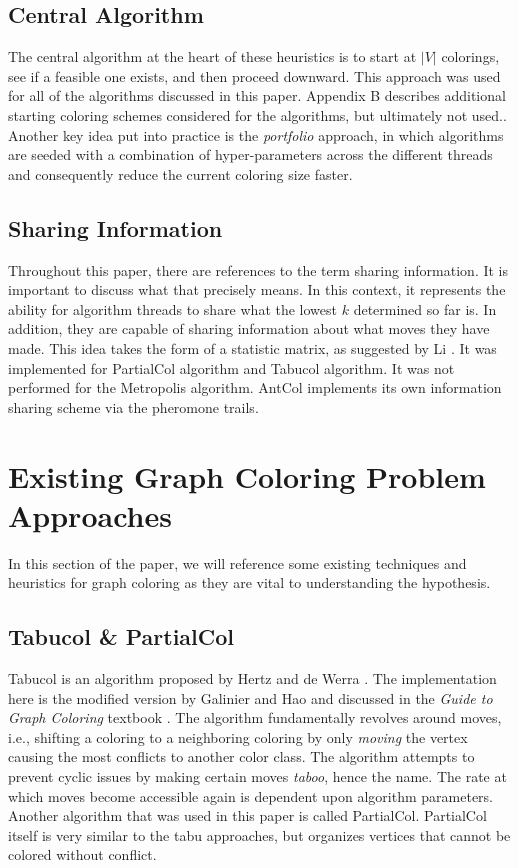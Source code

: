 \documentclass[runningheads]{llncs}
\begin{document}
\subsection{Central Algorithm}

The central algorithm at the heart of these heuristics is to start at $|V|$ colorings, see if a feasible one exists, and then proceed downward.
This approach was used for all of the algorithms discussed in this paper. Appendix B describes additional starting coloring schemes considered for the algorithms, but ultimately not used.. Another key idea put into practice is the \emph{portfolio} approach, in which algorithms are seeded with a combination of hyper-parameters across the different threads and consequently reduce the current coloring size faster.

\subsection{Sharing Information}
Throughout this paper, there are references to the term sharing information. It is important to discuss what that precisely means. In this context, it represents the ability for algorithm threads to share what the lowest $k$ determined so far is. In addition, they are capable of sharing information about what moves they have made. This idea takes the form of a statistic matrix, as suggested by Li \cite{https://doi.org/10.5445/ir/1000083192}. It was implemented for PartialCol algorithm and Tabucol algorithm. It was not performed for the Metropolis algorithm. AntCol implements its own information sharing scheme via the pheromone trails.

\section{Existing Graph Coloring Problem Approaches }

In this section of the paper, we will reference some existing techniques and heuristics for graph coloring as they are vital to understanding the hypothesis.

\subsection{Tabucol \& PartialCol}\label{AA}
Tabucol is an algorithm proposed by Hertz and de Werra \cite{hdw}. The implementation here is the modified version by Galinier and Hao \cite{TabuCol} and discussed in the \emph{Guide to Graph Coloring} textbook \cite{10.5555/2851123}. The algorithm fundamentally revolves around moves, i.e., shifting a coloring to a neighboring coloring by only \emph{moving} the vertex causing the most conflicts to another color class. The algorithm attempts to prevent cyclic issues by making certain moves \emph{taboo}, hence the name. The rate at which moves become accessible again is dependent upon algorithm parameters. Another algorithm that was used in this paper is called PartialCol. PartialCol itself is very similar to the tabu approaches, but organizes vertices that cannot be colored without conflict.
\end{document}
